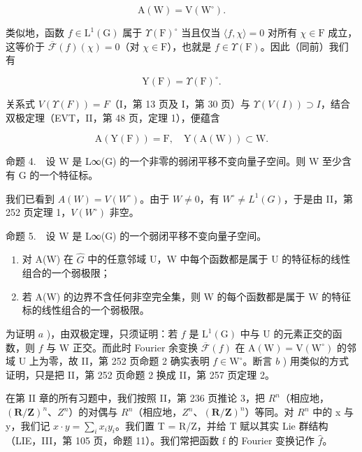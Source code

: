 \[
\mathrm{A} (\mathrm{W}) = \mathrm{V} (\mathrm{W} ^ {\circ}).
\]

类似地，函数 \(f \in \mathrm{L}^1(\mathrm{G})\) 属于 \(\Upsilon(\mathrm{F})^\circ\) 当且仅当 \(\langle f, \chi \rangle = 0\) 对所有 \(\chi \in \mathrm{F}\) 成立，这等价于 \(\overline{\mathcal{F}}(f)(\chi) = 0\)（对 \(\chi \in \mathrm{F}\)），也就是 \(f \in \Upsilon(\mathrm{F})\)。因此（同前）我们有

\[
\mathrm{Y} (\mathrm{F}) = \Upsilon (\mathrm{F}) ^ {\circ}.
\]

关系式 \(V(\Upsilon(F)) = F\)（I，第 13 页及 I，第 30 页）与 \(\Upsilon(V(I)) \supset I\)，结合双极定理（EVT，II，第 48 页，定理 1），便蕴含

\[
\mathrm{A} (\mathrm{Y} (\mathrm{F})) = \mathrm{F}, \quad \mathrm{Y} (\mathrm{A} (\mathrm{W})) \subset \mathrm{W}.
\]

命题 4.　设 W 是 L∞(G) 的一个非零的弱闭平移不变向量子空间。则 W 至少含有 G 的一个特征标。

我们已看到 \(A(W) = V(W^{\circ})\)。由于 \(W \neq 0\)，有 \(W^{\circ} \neq L^{1}(G)\)，于是由 II，第 252 页定理 1，\(V(W^{\circ})\) 非空。

命题 5.　设 W 是 L∞(G) 的一个弱闭平移不变向量子空间。

\begin{enumerate}
\def\labelenumi{\alph{enumi})}
\item
  对 A(W) 在 \(\widehat{G}\) 中的任意邻域 U，W 中每个函数都是属于 U 的特征标的线性组合的一个弱极限；
\item
  若 A(W) 的边界不含任何非空完全集，则 W 的每个函数都是属于 W 的特征标的线性组合的一个弱极限。
\end{enumerate}

为证明 \(a\) )，由双极定理，只须证明：若 \(f\) 是 \(\mathrm{L}^{1}(\mathrm{G})\) 中与 U 的元素正交的函数，则 \(f\) 与 W 正交。而此时 Fourier 余变换 \(\overline{\mathcal{F}}(f)\) 在 \(\mathrm{A}(\mathrm{W}) = \mathrm{V}(\mathrm{W}^{\circ})\) 的邻域 U 上为零，故 II，第 252 页命题 2 确实表明 \(f \in \mathrm{W}^{\circ}\)。断言 \(b\) ) 用类似的方式证明，只是把 II，第 252 页命题 2 换成 II，第 257 页定理 2。


在第 II 章的所有习题中，我们按照 II，第 236 页推论 3，把 \(R^{n}\)（相应地，\((\mathbf{R}/\mathbf{Z})^{n}\)、\(Z^{n}\)）的对偶与 \(R^{n}\)（相应地，\(Z^{n}\)、\((\mathbf{R}/\mathbf{Z})^{n}\)）等同。对 \(R^{n}\) 中的 x 与 y，我们记 \(x \cdot y = \sum_{i} x_{i} y_{i}\)。我们置 T = R/Z，并给 T 赋以其实 Lie 群结构（LIE，III，第 105 页，命题 11）。我们常把函数 f 的 Fourier 变换记作 \(\widehat{f}\)。

